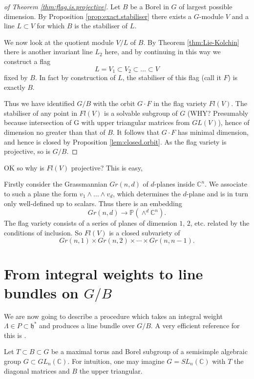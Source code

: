 \documentclass[12pt]{article}
\theoremstyle{plain}
\theoremstyle{definition}
\numberwithin{equation}{section}
\newcommand{\La}{\Lambda}
\newcommand{\C}{\mathbb{C}}
\newcommand{\bbP}{\mathbb{P}}
\newcommand{\h}{\mathfrak{h}}
\begin{document}
\begin{proof}[of Theorem \ref{thm:flag.is.projective}]
Let $B$ be a Borel in $G$ of largest possible dimension. By Proposition \ref{prop:exact.stabiliser} there exists a $G$-module $V$ and a line $L \subset V$ for which $B$ is the stabiliser of $L$.

We now look at the quotient module $V / L$ of $B$. By Theorem \ref{thm:Lie-Kolchin} there is another invariant line $L_2$ here, and by continuing in this way we construct a flag
\[
L = V_1 \subset V_2 \subset \ldots \subset V
\]
fixed by $B$. In fact by construction of $L$, the stabiliser of this flag (call it $F$) is exactly $B$.

Thus we have identified $G / B$ with the orbit $G \cdot F$ in the flag variety $Fl(V)$. The stabiliser of any point in $Fl(V)$ is a solvable subgroup of $G$ (WHY? Presumably because intersection of G with upper triangular matrices from $GL(V)$), hence of dimension no greater than that of $B$. It follows that $G \cdot F$ has minimal dimension, and hence is closed by Proposition \ref{lem:closed.orbit}. As the flag variety is projective, so is $G/B$.
\end{proof}

OK so why is $Fl(V)$ projective? This is easy, 

Firstly consider the Grassmannian $Gr(n, d)$ of $d$-planes inside $\C^n$. We associate to such a plane the form $v_1 \wedge \ldots \wedge v_d$, which determines the $d$-plane and is in turn only well-defined up to scalars. Thus there is an embedding
\[
Gr(n, d) \rightarrow \bbP(\wedge^d \C^n).
\]
The flag variety consists of a series of planes of dimension $1$, $2$, etc. related by the conditions of inclusion. So $Fl(V)$ is a closed subvariety of
\[
Gr(n, 1) \times Gr(n, 2) \times \cdots \times Gr(n, n-1).
\]






\section{From integral weights to line bundles on $G/B$}


We are now going to describe a procedure which takes an integral weight $\La \in P \subset \h^*$ and produces a line bundle over $G/B$. A very efficient reference for this is {\cite[p. 253]{HTT}}.

Let $T \subset B \subset G$ be a maximal torus and Borel subgroup of a semisimple algebraic group $G \subset GL_n(\C)$. For intuition, one may imagine $G = SL_n(\C)$ with $T$ the diagonal matrices and $B$ the upper triangular.
\end{document}
